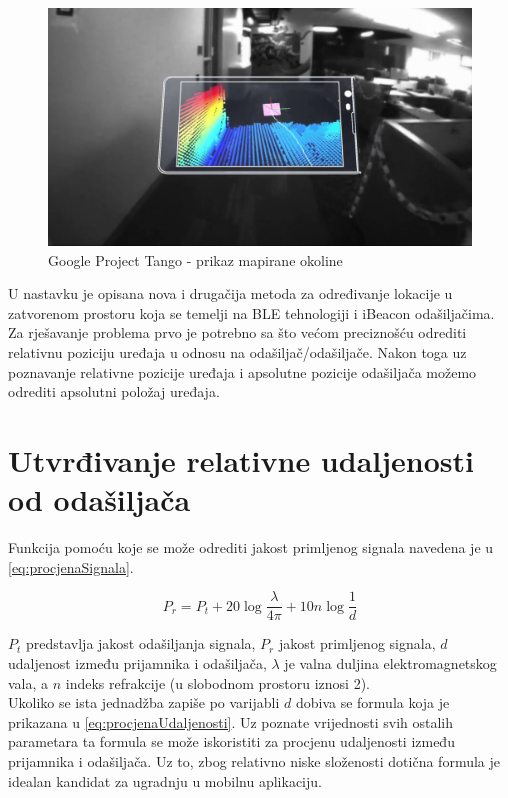 \begin{figure}[H]
    \centering
    \includegraphics[scale=0.24]{pictures/tango2}
    \caption{Google Project Tango - prikaz mapirane okoline}
\end{figure}

U nastavku je opisana nova i drugačija metoda za određivanje lokacije u zatvorenom prostoru koja se temelji na BLE tehnologiji i iBeacon odašiljačima. 
Za rješavanje problema prvo je potrebno sa što većom preciznošću odrediti relativnu poziciju uređaja u odnosu na odašiljač/odašiljače. 
Nakon toga uz poznavanje relativne pozicije uređaja i apsolutne pozicije odašiljača možemo odrediti apsolutni položaj uređaja.

\section*{Utvrđivanje relativne udaljenosti od odašiljača}

Funkcija pomoću koje se može odrediti jakost primljenog signala navedena je u \eqref{eq:procjenaSignala}.

\begin{equation}
	\label{eq:procjenaSignala}
	P_r = P_t + 20\log{\frac{\lambda}{4\pi}} + 10n\log{\frac{1}{d}}
\end{equation}

$P_t$ predstavlja jakost odašiljanja signala, $P_r$ jakost primljenog signala, $d$ udaljenost između prijamnika i odašiljača, $\lambda$ je valna duljina elektromagnetskog vala, a $n$ indeks refrakcije (u slobodnom prostoru iznosi 2).
\\

Ukoliko se ista jednadžba zapiše po varijabli $d$ dobiva se formula koja je prikazana u \eqref{eq:procjenaUdaljenosti}. 
Uz poznate vrijednosti svih ostalih parametara ta formula se može iskoristiti za procjenu udaljenosti između prijamnika i odašiljača.
Uz to, zbog relativno niske složenosti dotična formula je idealan kandidat za ugradnju u mobilnu aplikaciju.

